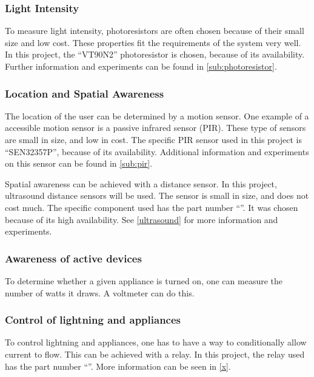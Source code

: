 \subsubsection{Light Intensity}
To measure light intensity, photoresistors are often chosen because of their small size and low cost. These properties fit the requirements of the system very well. In this project, the \enquote{VT90N2} photoresistor is chosen, because of its availability. Further information and experiments can be found in \cref{sub:photoresistor}.

\subsubsection{Location and Spatial Awareness}
The location of the user can be determined by a motion sensor. One example of a accessible motion sensor is a passive infrared sensor (PIR). These type of sensors are small in size, and low in cost. The specific PIR sensor used in this project is \enquote{SEN32357P}, because of its availability. Additional information and experiments on this sensor can be found in \cref{sub:pir}.

Spatial awareness can be achieved with a distance sensor. In this project, ultrasound distance sensors will be used. The sensor is small in size, and does not cost much. The specific component used has the part number \enquote{}. It was chosen because of its high availability. See \cref{ultrasound} for more information and experiments.

\subsubsection{Awareness of active devices}
To determine whether a given appliance is turned on, one can measure the number of watts it draws. A voltmeter can do this.

\subsubsection{Control of lightning and appliances}
To control lightning and appliances, one has to have a way to conditionally allow current to flow. This can be achieved with a relay. In this project, the relay used has the part number \enquote{}. More information can be seen in \cref{x}.

